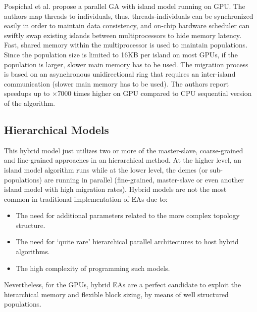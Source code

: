 \documentclass[review]{elsarticle}
\begin{document}
Pospichal et al. \cite{pospichalParallelGeneticAlgorithOnCUDA2010,9253} propose a parallel GA with island model running on GPU. The authors map threads to individuals, thus, threads-individuals can be synchronized easily in order to maintain data consistency, and on-chip hardware scheduler can swiftly swap existing islands between multiprocessors to hide memory latency. Fast, shared memory within the multiprocessor is used to maintain populations.
Since the population size is limited to 16KB per island on most GPUs, if the population is larger, slower main memory has to be used. The migration process is based on an asynchronous unidirectional ring that requires an inter-island communication (slower main memory has to be used). The authors report speedups up to $\times7000$ times higher on GPU compared to CPU sequential version of the algorithm.

\subsection{Hierarchical Models}

This hybrid model just utilizes two or more of the master-slave, coarse-grained and fine-grained approaches in an hierarchical method. At the higher level, an island model algorithm runs while at the lower level, the demes (or sub-populations) are running in parallel (fine-grained, master-slave or even another island model with high migration rates). Hybrid models are not the most common in traditional implementation of EAs due to:
\begin{itemize}
 \item The need for additional parameters related to the more complex topology structure. 
 \item The need for `quite rare' hierarchical parallel architectures to host hybrid algorithms. 
\item The high complexity of programming such models. 
\end{itemize}

Nevertheless, for the GPUs, hybrid EAs are a perfect candidate to exploit the hierarchical memory and flexible block sizing, by means of well structured populations. 
\end{document}
